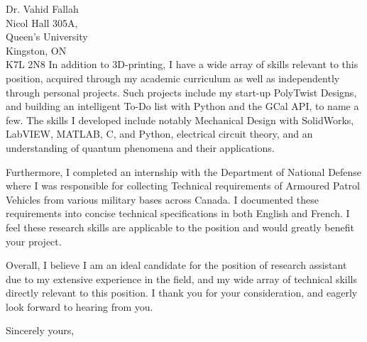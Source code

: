 \documentclass[11pt]{letter} %
\begin{document}
\begin{letter}{Dr. Vahid Fallah \\
Nicol Hall 305A, \\
Queen's University \\
Kingston, ON \\
K7L 2N8}
In addition to 3D-printing, I have a wide array of skills relevant to this position, acquired through my academic curriculum as well as independently through personal projects. Such projects include my start-up PolyTwist Designs, and building an intelligent To-Do list with Python and the GCal API, to name a few. The skills I developed include notably Mechanical Design with SolidWorks, LabVIEW, MATLAB, C, and Python, electrical circuit theory, and an understanding of quantum phenomena and their applications.

Furthermore, I completed an internship with the Department of National Defense where I was responsible for collecting Technical requirements of Armoured Patrol Vehicles from various military bases across Canada. I documented these requirements into concise technical specifications in both English and French. I feel these research skills are applicable to the position and would greatly benefit your project.

Overall, I believe I am an ideal candidate for the position of research assistant due to my extensive experience in the field, and my wide array of technical skills directly relevant to this position. I thank you for your consideration, and eagerly look forward to hearing from you.

\closing{Sincerely yours,}


\end{letter}
\end{document}
